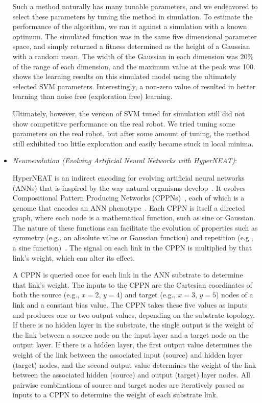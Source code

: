 \begin{itemize}
  Such a method naturally has many tunable parameters, and we
  endeavored to select these parameters by tuning the method in
  simulation.  To estimate the performance of the algorithm, we ran it
  against a simulation with a known optimum.  The simulated function
  was in the same five dimensional parameter space, and simply
  returned a fitness determined as the height of a Gaussian with a
  random mean.  The width of the Gaussian in each dimension was 20\%
  of the range of each dimension, and the maximum value at the peak
  was 100.   shows the learning results on
  this simulated model using the ultimately selected SVM parameters.
  Interestingly, a non-zero value of  resulted in better
  learning than noise free (exploration free) learning.

  Ultimately, however, the version of SVM tuned for simulation still
  did not show competitive performance on the real robot.  We tried
  tuning some parameters on the real robot, but after some amount of
  tuning, the method still exhibited too little exploration and easily
  became stuck in local minima.

\item \emph{Neuroevolution (Evolving Artificial Neural Networks with HyperNEAT)}: 
    
  HyperNEAT is an indirect encoding for evolving artificial neural networks (ANNs) that is inspired by the way natural organisms develop~\cite{stanley2009hypercube}. It evolves Compositional Pattern Producing Networks (CPPNs)~\cite{stanley2007compositional}, each of which is a genome that encodes an ANN phenotype~\cite{stanley2009hypercube}. Each CPPN is itself a directed graph, where each node is a mathematical function, such as sine or Gaussian. The nature of these functions can facilitate the evolution of properties such as symmetry (e.g., an absolute value or Gaussian function) and repetition (e.g., a sine function)~\cite{stanley2009hypercube, stanley2007compositional}. The signal on each link in the CPPN is multiplied by that link's weight, which can alter its effect.
  
A CPPN is queried once for each link in the ANN substrate to determine that link's weight. The inputs to the CPPN are the Cartesian coordinates of both the source (e.g., $x = 2$, $y = 4$) and target (e.g., $x = 3$, $y = 5$) nodes of a link and a constant bias value. The CPPN takes these five values as inputs and produces one or two output values, depending on the substrate topology. If there is no hidden layer in the substrate, the single output is the weight of the link between a source node on the input layer and a target node on the output layer. If there is a hidden layer, the first output value determines the weight of the link between the associated input (source) and hidden layer (target) nodes, and the second output value determines the weight of the link between the associated hidden (source) and output (target) layer nodes. All pairwise combinations of source and target nodes are iteratively passed as inputs to a CPPN to determine the weight of each substrate link. 


\end{itemize}
